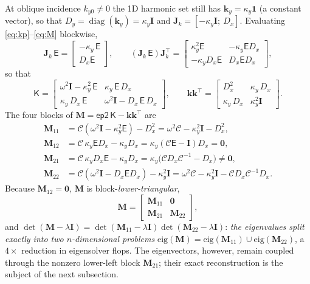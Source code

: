 \documentclass[11pt]{article}
\theoremstyle{remark}
\newcommand{\Cmat}{\mathcal{C}}
\newcommand{\kp}{\mathsf{K}}
\newcommand{\epinv}{\mathsf{E}}
\newcommand{\Jk}{\mathbf{J}_k}
\newcommand{\kk}{\mathbf{k}}
\newcommand{\Id}{\mathbf{I}}
\DeclareMathOperator{\diag}{diag}
\begin{document}
At oblique incidence $k_{y0}\neq0$ the 1D harmonic set still has
$\kk_y=\kappa_y\mathbf{1}$ (a constant vector), so that
$D_y=\diag(\kk_y)=\kappa_y\Id$ and
$\Jk=[-\kappa_y\Id;\ D_x]$. Evaluating \eqref{eq:kp}--\eqref{eq:M} blockwise,
\begin{equation}
\Jk\,\epinv=
\begin{bmatrix}-\kappa_y\,\epinv\\ D_x\epinv\end{bmatrix},\qquad
(\Jk\,\epinv)\Jk^{\top}=
\begin{bmatrix}
\kappa_y^2\epinv & -\kappa_y\epinv D_x\\
-\kappa_y D_x\epinv & D_x\epinv D_x
\end{bmatrix},
\end{equation}
so that
\begin{equation}
\kp=
\begin{bmatrix}
\omega^2\Id-\kappa_y^2\,\epinv & \kappa_y\,\epinv\,D_x\\[2pt]
\kappa_y\,D_x\,\epinv & \omega^2\Id-D_x\,\epinv\,D_x
\end{bmatrix},\qquad
\kk\kk^{\top}=
\begin{bmatrix}
D_x^2 & \kappa_y\,D_x\\[2pt]
\kappa_y\,D_x & \kappa_y^2\Id
\end{bmatrix}.
\label{eq:kplow}
\end{equation}
The four blocks of $\mathbf{M}=\mathsf{ep2}\,\kp-\kk\kk^{\top}$ are
\begin{align}
\mathbf{M}_{11}&=\Cmat(\omega^2\Id-\kappa_y^2\epinv)-D_x^2
=\omega^2\Cmat-\kappa_y^2\Id-D_x^2,\\
\mathbf{M}_{12}&=\Cmat\,\kappa_y\epinv D_x-\kappa_y D_x
=\kappa_y(\Cmat\epinv-\Id)D_x=\mathbf{0},\\
\mathbf{M}_{21}&=\Cmat\,\kappa_y D_x\epinv-\kappa_y D_x
=\kappa_y\big(\Cmat D_x\Cmat^{-1}-D_x\big)\neq\mathbf{0},\\
\mathbf{M}_{22}&=\Cmat(\omega^2\Id-D_x\epinv D_x)-\kappa_y^2\Id
=\omega^2\Cmat-\kappa_y^2\Id-\Cmat D_x\Cmat^{-1}D_x.
\label{eq:Mblocks}
\end{align}
Because $\mathbf{M}_{12}=\mathbf{0}$, $\mathbf{M}$ is block-\emph{lower-triangular},
\begin{equation}
\mathbf{M}=
\begin{bmatrix}\mathbf{M}_{11}&\mathbf{0}\\
\mathbf{M}_{21}&\mathbf{M}_{22}\end{bmatrix},
\label{eq:Mblt}
\end{equation}
and
$\det(\mathbf{M}-\lambda\Id)=\det(\mathbf{M}_{11}-\lambda\Id)\det(\mathbf{M}_{22}-\lambda\Id)$:
\emph{the eigenvalues split exactly into two $n$-dimensional problems}
$\mathrm{eig}(\mathbf{M})=\mathrm{eig}(\mathbf{M}_{11})\cup\mathrm{eig}(\mathbf{M}_{22})$,
a $4\times$ reduction in eigensolver flops. The eigenvectors, however, remain
coupled through the nonzero lower-left block $\mathbf{M}_{21}$; their exact
reconstruction is the subject of the next subsection.
\end{document}
